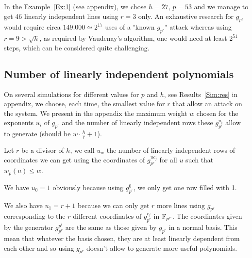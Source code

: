 \documentclass[a4paper]{article}
\begin{document}
In the Example~\ref{Ex:1} (see appendix), we chose $h = 27$, $p = 53$ and we manage to get 46 linearly independent lines using $r = 3$ only.
An exhaustive research for $g_{p^3}$ would require circa $149.000 \simeq 2^{17}$ uses of a "known $g_{p^r}$" attack whereas using $r = 9 > \sqrt{h}$, as required by Vaudenay's algorithm, one would need at least $2^{51}$ steps, which can be considered quite challenging.\\


\subsection{Number of linearly independent polynomials}

On several simulations for different values for $p$ and $h$, see Results~\ref{Sim:res} in appendix, we choose, each time, the smallest value for $r$ that allow an attack on the system. We present in the appendix the maximum weight $w$ chosen for the exponents $u_i$ of $g_{p^r}$ and the number of linearly independent rows these $g_{p^r}^{u_i}$ allow to generate (should be $w\cdot \frac{h}{r} +1$).







Let $r$ be a divisor of $h$, we call $u_w$ the number of linearly independent rows of coordinates we can get using the coordinates of $g_{p^r}^{uc_j}$ for all $u$ such that $w_p(u) \leq w$.

We have $u_0 = 1$ obviously because using $g_{p^r}^0$, we only get one row filled with 1.

We also have $u_1 = r+1$ because we can only get $r$ more lines using $g_{p^r}$ corresponding to the $r$ different coordinates of $g_{p^r}^{c_j}$ in $\mathbb{F}_{p^r}$. The coordinates given by the generator $g_{p^r}^{p^i}$ are the same as those given by $g_{p^r}$ in a normal basis. This mean that whatever the basis chosen, they are at least linearly dependent from each other and so using $g_{p^r}$ doesn't allow to generate more useful polynomials.
\end{document}
